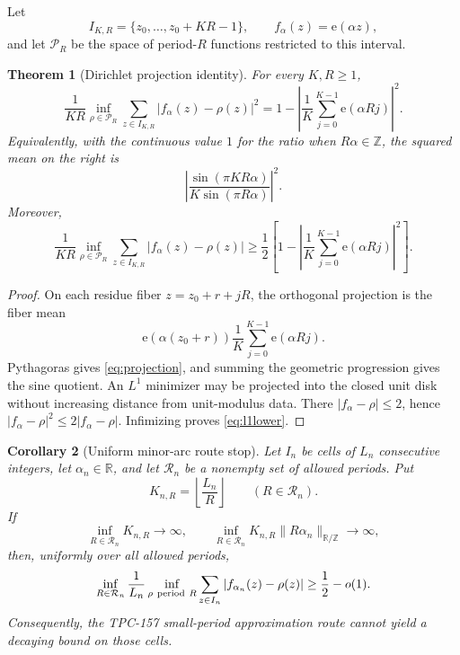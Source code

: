 \documentclass[11pt]{article}
\newtheorem{theorem}{Theorem}[section]
\newtheorem{corollary}[theorem]{Corollary}
\theoremstyle{definition}
\newcommand{\e}{\mathrm e}
\newcommand{\norm}[1]{\lVert#1\rVert}
\begin{document}
Let
\[
 I_{K,R}=\{z_0,\ldots,z_0+KR-1\},\qquad
 f_\alpha(z)=\e(\alpha z),
\]
and let \(\mathcal P_R\) be the space of period-\(R\) functions
restricted to this interval.

\begin{theorem}[Dirichlet projection identity]\label{thm:projection}
For every \(K,R\ge1\),
\begin{equation}
 \frac1{KR}\inf_{\rho\in\mathcal P_R}
 \sum_{z\in I_{K,R}}|f_\alpha(z)-\rho(z)|^2
 =
 1-\left|
 \frac1K\sum_{j=0}^{K-1}\e(\alpha Rj)
 \right|^2.
\label{eq:projection}
\end{equation}
Equivalently, with the continuous value \(1\) for the ratio when
\(R\alpha\in\mathbb Z\), the squared mean on the right is
\[
 \left|
 \frac{\sin(\pi KR\alpha)}
 {K\sin(\pi R\alpha)}
 \right|^2.
\]
Moreover,
\begin{equation}
 \frac1{KR}\inf_{\rho\in\mathcal P_R}
 \sum_{z\in I_{K,R}}|f_\alpha(z)-\rho(z)|
 \ge
 \frac12\left[
 1-\left|
 \frac1K\sum_{j=0}^{K-1}\e(\alpha Rj)
 \right|^2\right].
\label{eq:l1lower}
\end{equation}
\end{theorem}

\begin{proof}
On each residue fiber \(z=z_0+r+jR\), the orthogonal projection is
the fiber mean
\[
 \e(\alpha(z_0+r))\frac1K
 \sum_{j=0}^{K-1}\e(\alpha Rj).
\]
Pythagoras gives \eqref{eq:projection}, and summing the geometric
progression gives the sine quotient.  An \(L^1\) minimizer may be
projected into the closed unit disk without increasing distance from
unit-modulus data.  There \(|f_\alpha-\rho|\le2\), hence
\(|f_\alpha-\rho|^2\le2|f_\alpha-\rho|\).  Infimizing proves
\eqref{eq:l1lower}.
\end{proof}

\begin{corollary}[Uniform minor-arc route stop]\label{cor:stop}
Let \(I_n\) be cells of \(L_n\) consecutive integers, let
\(\alpha_n\in\mathbb R\), and let \(\mathcal R_n\) be a nonempty set
of allowed periods.  Put
\[
 K_{n,R}=\left\lfloor\frac{L_n}{R}\right\rfloor
 \qquad(R\in\mathcal R_n).
\]
If
\begin{equation}
 \inf_{R\in\mathcal R_n}K_{n,R}\longrightarrow\infty,
 \qquad
 \inf_{R\in\mathcal R_n}
 K_{n,R}\norm{R\alpha_n}_{\mathbb R/\mathbb Z}
 \longrightarrow\infty,
\label{eq:uniform-minor}
\end{equation}
then, uniformly over all allowed periods,
\[
 \inf_{R\in\mathcal R_n}\frac1{L_n}
 \inf_{\rho\ {\rm period}\ R}
 \sum_{z\in I_n}|f_{\alpha_n}(z)-\rho(z)|
 \ge\frac12-o(1).
\]
Consequently, the TPC-157 small-period approximation route cannot
yield a decaying bound on those cells.
\end{corollary}
\end{document}
